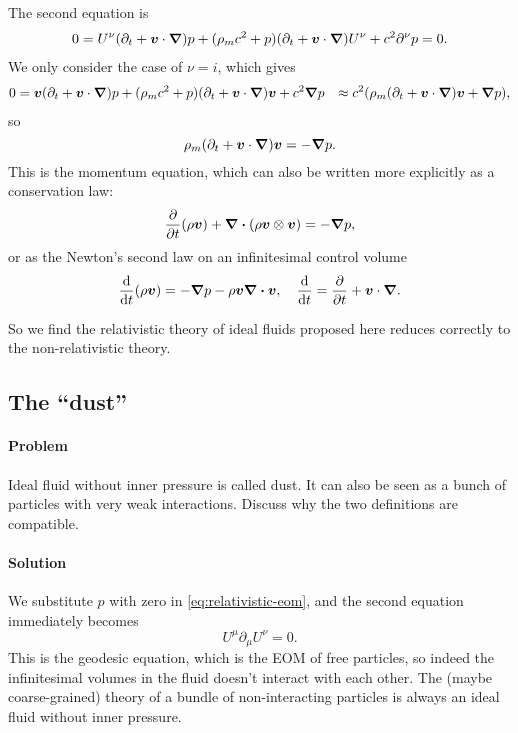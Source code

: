 \documentclass[hyperref, a4paper]{article}
\def\\{}%
\begin{document}
The second equation is 
\[
    \begin{aligned}
        0 = U^\nu (\partial_t + \vb*{v} \cdot \grad) p + (\rho_m c^2 + p) (\partial_t + \vb*{v} \cdot \grad) U^\nu + c^2 \partial^\nu p = 0.
    \end{aligned}
\]
We only consider the case of $\nu = i$, which gives 
\[
    \begin{aligned}
        0 &= \vb*{v} (\partial_t + \vb*{v} \cdot \grad) p + (\rho_m c^2 + p) (\partial_t + \vb*{v} \cdot \grad) \vb*{v} + c^2 \grad{p} \\ 
        &\approx c^2 ( \rho_m (\partial_t + \vb*{v} \cdot \grad) \vb*{v} + \grad{p} ), 
    \end{aligned}
\]
so 
\begin{equation}
    \rho_m (\partial_t + \vb*{v} \cdot \grad) \vb*{v} = - \grad{p}.
\end{equation}
This is the momentum equation, which can also be written more explicitly as a conservation law:
\begin{equation}
    \pdv{t} (\rho \vb*{v}) + \div{(\rho \vb*{v} \otimes \vb*{v})} = - \grad{p},
\end{equation} 
or as the Newton's second law on an infinitesimal control volume
\begin{equation}
    \dv{t} (\rho \vb*{v})  = -\grad{p} - \rho \vb*{v} \div{\vb*{v}} , \quad \dv{t} = \pdv{t} + \vb*{v} \cdot \grad.
\end{equation}

So we find the relativistic theory of ideal fluids proposed here reduces correctly to the non-relativistic theory.

\subsection{The ``dust''}

\paragraph{Problem} Ideal fluid without inner pressure is called dust. It can also be seen as a bunch of 
particles with very weak interactions. Discuss why the two definitions are compatible.

\paragraph{Solution} We substitute $p$ with zero in \eqref{eq:relativistic-eom}, and the second equation 
immediately becomes 
\begin{equation}
    U^\mu \partial_\mu U^\nu = 0.
\end{equation}
This is the geodesic equation, which is the EOM of free particles, so indeed the infinitesimal volumes in 
the fluid doesn't interact with each other. The (maybe coarse-grained) theory of a bundle of non-interacting 
particles is always an ideal fluid without inner pressure. 
\end{document}
